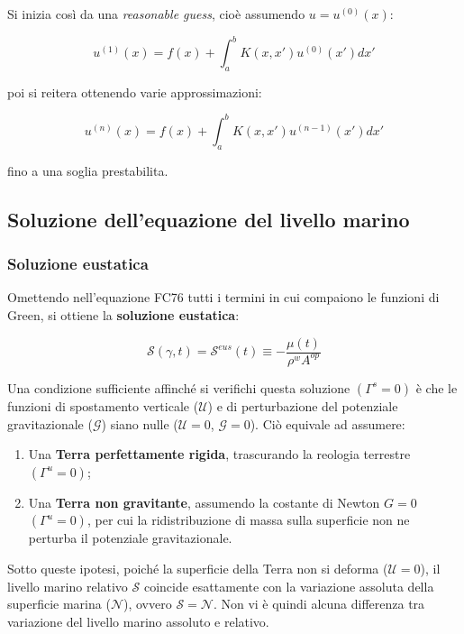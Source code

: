 \documentclass[a4paper,12pt]{book}
\begin{document}
\noindent Si inizia così da una \textit{reasonable guess}, cioè assumendo $u = u^{(0)}(x)$:

\begin{equation}
    u^{(1)}(x) = f(x) + \int_a^b K(x,x')u^{(0)}(x') dx'
\end{equation}

\noindent
poi si reitera ottenendo varie approssimazioni:

\begin{equation}
    u^{(n)}(x) = f(x) + \int_a^b K(x,x')u^{(n-1)}(x') dx'
\end{equation}

\noindent
fino a una soglia prestabilita.

\subsection{\textcolor{colore7}{Soluzione dell'equazione del livello marino}}

\subsubsection{\textcolor{colore7}{Soluzione eustatica}}

Omettendo nell'equazione FC76 tutti i termini in cui compaiono le funzioni di Green, si ottiene la \textbf{soluzione eustatica}:

\begin{equation}
    \mathcal{S}(\gamma,t) = \mathcal{S}^{eus}(t) \equiv - \frac{\mu (t)}{\rho^w A^{op}}
\end{equation}

\noindent
Una condizione sufficiente affinché si verifichi questa soluzione $(\Gamma^s = 0)$
è che le funzioni di spostamento verticale ($\mathcal{U}$) e di perturbazione del potenziale gravitazionale ($\mathcal{G}$) siano nulle ($\mathcal{U}=0$, $\mathcal{G}=0$).
Ciò equivale ad assumere:
\begin{enumerate}
    \item Una \textbf{Terra perfettamente rigida}, trascurando la reologia terrestre $(\Gamma^u = 0)$;
    \item Una \textbf{Terra non gravitante}, assumendo la costante di Newton $G=0$ $(\Gamma^u = 0)$, per cui la ridistribuzione di massa sulla superficie non ne perturba il potenziale gravitazionale.
\end{enumerate}

\noindent
Sotto queste ipotesi, poiché la superficie della Terra non si deforma ($\mathcal{U}=0$),
il livello marino relativo $\mathcal{S}$ coincide esattamente con la variazione assoluta della superficie marina ($\mathcal{N}$),
ovvero $\mathcal{S} = \mathcal{N}$. Non vi è quindi alcuna differenza tra variazione del livello marino assoluto e relativo.\\
\end{document}
